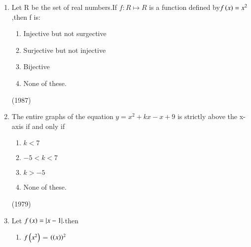\documentclass[journal]{IEEEtran}
\begin{document}
 


\begin{enumerate}
     


  \item Let R be the set of real numbers.If $f:R \mapsto R $ is
  a function defined by$f\left(x\right)= x^2 $,then f is:

    \begin{multicols}{2}
      \begin{enumerate}
          
        \item Injective but not surgective 
        
        \item Surjective but not injective
        
        \item Bijective
        
        \item None of these.
      \end{enumerate}
    \end{multicols}

  \hfill
  (1987)


 


  \item The entire graphs of the equation $y= x{^2}+ kx - x +9$ is strictly above the x-axis 
  if and only if
    \begin{multicols}{2}
      \begin{enumerate}
          


        \item $k<7$
        
        \item $-5<k<7$
        
        \item $k>-5$
        
        \item None of these.
      \end{enumerate}
    \end{multicols}
  \hfill
  (1979)


\item Let $f\left(x\right)=|x-1|.$then
  \begin{multicols}{2}
      \begin{enumerate}
      \item $f\left(x^2\right)$ = $(\left(x\right))^2$


\end{enumerate}
\end{multicols}
\end{enumerate}
\end{document}
